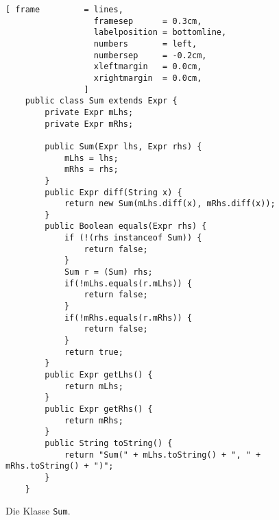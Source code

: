 \begin{figure}[thb]
  \centering
\begin{Verbatim}[ frame         = lines, 
                  framesep      = 0.3cm, 
                  labelposition = bottomline,
                  numbers       = left,
                  numbersep     = -0.2cm,
                  xleftmargin   = 0.0cm,
                  xrightmargin  = 0.0cm,
                ]
    public class Sum extends Expr {
        private Expr mLhs;
        private Expr mRhs;
    
        public Sum(Expr lhs, Expr rhs) {
            mLhs = lhs;
            mRhs = rhs;
        }
        public Expr diff(String x) {
            return new Sum(mLhs.diff(x), mRhs.diff(x));
        }
        public Boolean equals(Expr rhs) {
            if (!(rhs instanceof Sum)) {
                return false;
            }
            Sum r = (Sum) rhs;
            if(!mLhs.equals(r.mLhs)) {
                return false;
            }
            if(!mRhs.equals(r.mRhs)) {
                return false;
            }
            return true;
        }
        public Expr getLhs() {
            return mLhs;
        }
        public Expr getRhs() {
            return mRhs;
        }
        public String toString() {
            return "Sum(" + mLhs.toString() + ", " + mRhs.toString() + ")";
        }
    }
\end{Verbatim} 
\vspace*{-0.3cm}
  \caption{Die Klasse \texttt{Sum}.}
  \label{fig:Sum.java.ep}
\end{figure} %

